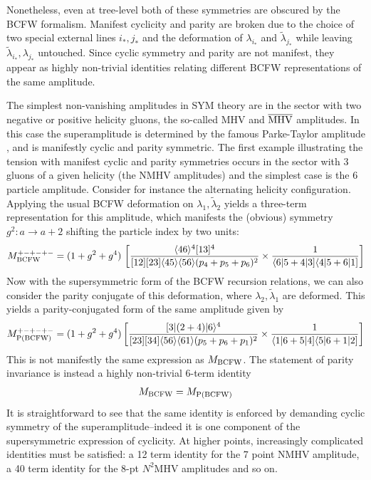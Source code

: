 \documentclass[12pt]{article}
\newcommand{\be}{\begin{eqnarray}}
\newcommand{\ee}{\end{eqnarray}}
\begin{document}
Nonetheless, even at tree-level both of these symmetries are obscured by the BCFW formalism.
Manifest cyclicity and parity are broken due to the choice
of two special external lines $i_*,j_*$ and the deformation of $\lambda_{i_*}$ and $\tilde
\lambda_{j_*}$ while leaving $\tilde \lambda_{i_*},\lambda_{j_*}$ untouched. Since cyclic symmetry and parity  are not manifest, they appear as highly non-trivial identities relating different BCFW
representations of the same amplitude.

The simplest non-vanishing amplitudes in SYM theory are in the sector with two negative or positive helicity gluons, the so-called MHV and 
$\overline{{\rm MHV}}$ amplitudes. In this case the superamplitude is determined by the famous Parke-Taylor amplitude \cite{Parke:1986gb}, and is manifestly cyclic and parity symmetric. The first example illustrating the tension with manifest cyclic and parity symmetries occurs in the sector with 3 gluons of a given helicity (the NMHV amplitudes) and the simplest case is the 6 particle amplitude. Consider for instance the alternating helicity
configuration. Applying the usual BCFW deformation on $\lambda_1,
\tilde \lambda_2$ yields a three-term representation for this amplitude, which
manifests the (obvious) symmetry $g^2: a \to a+2$ shifting the particle
index by two units:
\begin{equation}
\label{6BCFW}
M^{+-+-+-}_{{\rm BCFW}} = (1 + g^2 + g^4) \,\left[\frac{\langle 4 6 \rangle^4 [1 3]^4}{[12][23]\langle 45 \rangle \langle 56 \rangle (p_4 + p_5 + p_6)^2}
\times \frac{1}{\langle 6 |5 + 4|3] \langle 4|5 + 6 |1]} \right]
\end{equation}
Now with the supersymmetric form of the BCFW recursion relations, we
can also consider the parity conjugate of this deformation, where
$\lambda_2,\tilde \lambda_1$ are deformed. This yields a
parity-conjugated form of the same amplitude given by
\begin{equation}
\label{6PBCFW}
M^{+-+-+-}_{{\rm P(BCFW)}} =(1 + g^2 + g^4) \left[\frac{[3|(2+4)|6 \rangle^4}{[23][34]\langle 56 \rangle \langle 61 \rangle (p_5 + p_6 + p_1)^2}
\times \frac{1}{\langle 1 |6 + 5|4] \langle 5|6+ 1 |2]}\right]
\end{equation}
This is not manifestly the same expression as $M_{{\rm BCFW}}$.
The statement of parity invariance is instead a highly
non-trivial 6-term identity \be \label{hexagon}M_{{\rm BCFW}} =
M_{{\rm P(BCFW)}} \ee It is straightforward  to see that the same identity is enforced by demanding cyclic
symmetry of the superamplitude--indeed it is one component of the
supersymmetric expression of cyclicity. At higher points,
increasingly complicated identities must be satisfied: a 12 term
identity for the 7 point NMHV amplitude, a 40 term identity for the
8-pt $N^2$MHV amplitudes and so on.
\end{document}
